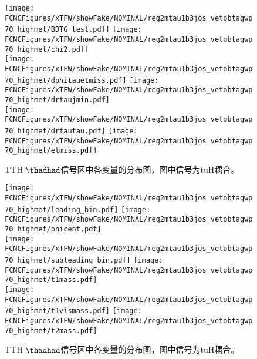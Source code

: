 \begin{figure}[H]
\centering
\texttt{[image: \\FCNCFigures/xTFW/showFake/NOMINAL/reg2mtau1b3jos\_vetobtagwp70\_highmet/BDTG\_test.pdf]}
\texttt{[image: \\FCNCFigures/xTFW/showFake/NOMINAL/reg2mtau1b3jos\_vetobtagwp70\_highmet/chi2.pdf]}
\\
\texttt{[image: \\FCNCFigures/xTFW/showFake/NOMINAL/reg2mtau1b3jos\_vetobtagwp70\_highmet/dphitauetmiss.pdf]}
\texttt{[image: \\FCNCFigures/xTFW/showFake/NOMINAL/reg2mtau1b3jos\_vetobtagwp70\_highmet/drtaujmin.pdf]}
\\
\texttt{[image: \\FCNCFigures/xTFW/showFake/NOMINAL/reg2mtau1b3jos\_vetobtagwp70\_highmet/drtautau.pdf]}
\texttt{[image: \\FCNCFigures/xTFW/showFake/NOMINAL/reg2mtau1b3jos\_vetobtagwp70\_highmet/etmiss.pdf]}
\\
\caption{TTH $\thadhad$信号区中各变量的分布图，图中信号为tuH耦合。}
\label{fig:var_reg2mtau1b3jos_vetobtagwp70_highmet_1}
\end{figure}
\begin{figure}[H]
\centering
\texttt{[image: \\FCNCFigures/xTFW/showFake/NOMINAL/reg2mtau1b3jos\_vetobtagwp70\_highmet/leading\_bin.pdf]}
\texttt{[image: \\FCNCFigures/xTFW/showFake/NOMINAL/reg2mtau1b3jos\_vetobtagwp70\_highmet/phicent.pdf]}
\\
\texttt{[image: \\FCNCFigures/xTFW/showFake/NOMINAL/reg2mtau1b3jos\_vetobtagwp70\_highmet/subleading\_bin.pdf]}
\texttt{[image: \\FCNCFigures/xTFW/showFake/NOMINAL/reg2mtau1b3jos\_vetobtagwp70\_highmet/t1mass.pdf]}
\\
\texttt{[image: \\FCNCFigures/xTFW/showFake/NOMINAL/reg2mtau1b3jos\_vetobtagwp70\_highmet/t1vismass.pdf]}
\texttt{[image: \\FCNCFigures/xTFW/showFake/NOMINAL/reg2mtau1b3jos\_vetobtagwp70\_highmet/t2mass.pdf]}
\\
\caption{TTH $\thadhad$信号区中各变量的分布图，图中信号为tuH耦合。}
\label{fig:var_reg2mtau1b3jos_vetobtagwp70_highmet_2}
\end{figure}
